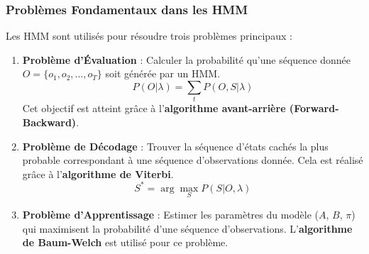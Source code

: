 \documentclass[a4paper,12pt,oneside]{report}	%
\begin{document}
            \subsubsection{Problèmes Fondamentaux dans les HMM}
                Les HMM sont utilisés pour résoudre trois problèmes principaux :
                    \begin{enumerate}
                        \item \textbf{Problème d’Évaluation} : Calculer la probabilité qu’une séquence donnée $O = \{o_1, o_2, \dots, o_T\}$ soit générée par un HMM. \[P(O | \lambda) = \sum_{t} P(O, S | \lambda)\]
                        Cet objectif est atteint grâce à l’\textbf{algorithme avant-arrière (Forward-Backward)}.
                        \item \textbf{Problème de Décodage} : Trouver la séquence d’états cachés la plus probable correspondant à une séquence d’observations donnée. Cela est réalisé grâce à l’\textbf{algorithme de Viterbi}. \[S^* = \arg\max_{S} P(S | O, \lambda)\]
                        \item \textbf{Problème d’Apprentissage} : Estimer les paramètres du modèle ($A$, $B$, $\pi$) qui maximisent la probabilité d’une séquence d’observations. L’\textbf{algorithme de Baum-Welch} est utilisé pour ce problème.
                \end{enumerate}
\end{document}
